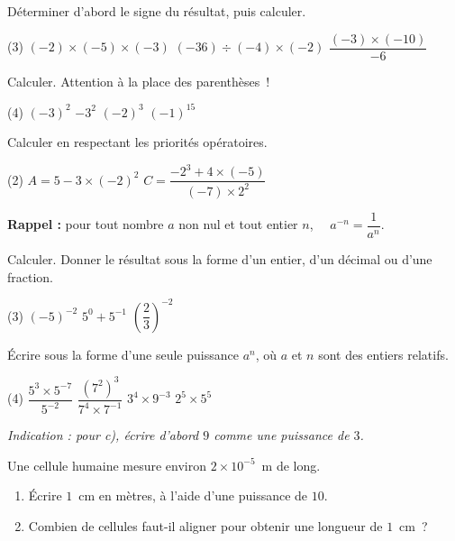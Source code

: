 \documentclass[a4paper,11pt,fleqn]{article}
\begin{document}
\begin{EXO}{}{}
Déterminer d'abord le signe du résultat, puis calculer.

\begin{tasks}(3)
	\task $(-2)\times(-5)\times(-3)$
	\task $(-36)\div(-4)\times(-2)$
	\task $\dfrac{(-3)\times(-10)}{-6}$
\end{tasks}
\end{EXO}

\begin{EXO}{}{}
Calculer. Attention à la place des parenthèses~!

\begin{tasks}(4)
	\task $(-3)^2$
	\task $-3^2$
	\task $(-2)^3$
	\task $(-1)^{15}$
\end{tasks}
\end{EXO}

\begin{EXO}{}{}
Calculer en respectant les priorités opératoires.

\begin{tasks}(2)
	\task $A = 5-3\times(-2)^2$
	\task $C = \dfrac{-2^3+4\times(-5)}{(-7)\times 2^2}$
\end{tasks}
\end{EXO}


\begin{EXO}{}{}
\textbf{Rappel :} pour tout nombre $a$ non nul et tout entier $n$, $\quad a^{-n}=\dfrac{1}{a^n}$.

Calculer. Donner le résultat sous la forme d'un entier, d'un décimal ou d'une fraction.

\begin{tasks}(3)
	\task $(-5)^{-2}$
	\task $5^0+5^{-1}$
	\task $\left(\dfrac{2}{3}\right)^{-2}$
\end{tasks}
\end{EXO}

\begin{EXO}{}{}
Écrire sous la forme d'une seule puissance $a^n$, où $a$ et $n$ sont des entiers relatifs.

\begin{tasks}(4)
	\task $\dfrac{5^3\times 5^{-7}}{5^{-2}}$
	\task $\dfrac{\left(7^2\right)^3}{7^4\times 7^{-1}}$
	\task $3^4\times 9^{-3}$
	\task $2^5\times 5^5$
\end{tasks}

\textit{Indication : pour c), écrire d'abord $9$ comme une puissance de $3$.}
\end{EXO}


\begin{EXO}{}{}
Une cellule humaine mesure environ $2\times 10^{-5}$~m de long.
\begin{enumerate}
	\item Écrire $1$~cm en mètres, à l'aide d'une puissance de $10$.
	\item Combien de cellules faut-il aligner pour obtenir une longueur de $1$~cm~?
\end{enumerate}
\end{EXO}
\end{document}
